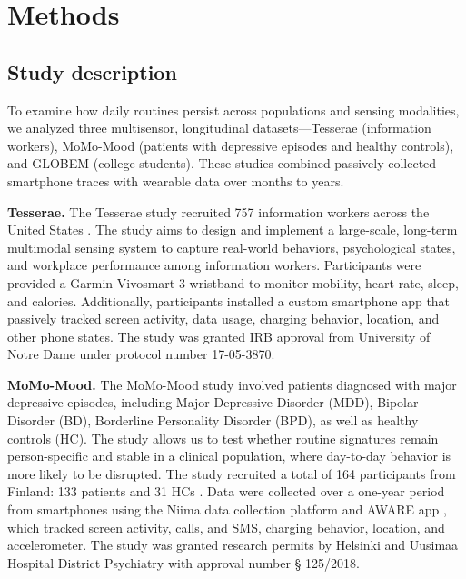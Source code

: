 \documentclass[pdflatex,sn-vancouver,Numbered]{bst/sn-jnl}%
\theoremstyle{thmstyleone}%
\theoremstyle{thmstyletwo}%
\theoremstyle{thmstylethree}%
\begin{document}
\section*{Methods}\label{sec:methods}  

\subsection*{Study description}\label{sec:methods:study_desc}  

To examine how daily routines persist across populations and sensing modalities, we analyzed three multisensor, longitudinal datasets—Tesserae (information workers), MoMo-Mood (patients with depressive episodes and healthy controls), and GLOBEM (college students). These studies combined passively collected smartphone traces with wearable data over months to years. 

\textbf{Tesserae.} The Tesserae study recruited 757 information workers across the United States \cite{mattingly2019tesserae}. The study aims to design and implement a large-scale, long-term multimodal sensing system to capture real-world behaviors, psychological states, and workplace performance among information workers. Participants were provided a Garmin Vivosmart 3 wristband to monitor mobility, heart rate, sleep, and calories. Additionally, participants installed a custom smartphone app that passively tracked screen activity, data usage, charging behavior, location, and other phone states. The study was granted IRB approval from University of Notre Dame under protocol number 17-05-3870.

\textbf{MoMo-Mood.} The MoMo-Mood study involved patients diagnosed with major depressive episodes, including Major Depressive Disorder (MDD), Bipolar Disorder (BD), Borderline Personality Disorder (BPD), as well as healthy controls (HC). The study allows us to test whether routine signatures remain person-specific and stable in a clinical population, where day-to-day behavior is more likely to be disrupted. The study recruited a total of 164 participants from Finland: 133 patients and 31 HCs \cite{aledavood2025multimodal}. Data were collected over a one-year period from smartphones using the Niima data collection platform and AWARE app \cite{aledavood2017data, ferreiraAWAREMobileContext2015}, which tracked screen activity, calls, and SMS, charging behavior, location, and accelerometer. The study was granted research permits by Helsinki and Uusimaa Hospital District Psychiatry with approval number § 125/2018.
\end{document}
